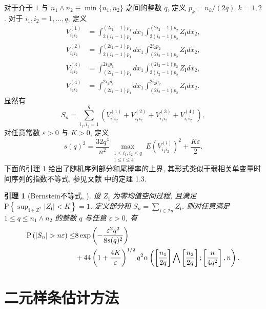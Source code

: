 \documentclass[a4paper,openay,14pt]{ctexbook}
\numberwithin{equation}{section}
\numberwithin{lem}{section}
\newtheorem{lemma}[theorem]{引理}%
\begin{document}
对于介于 $1$ 与 $n_1\wedge n_2\equiv \min\{n_1,n_2\}$ 之间的整数 $q$, 定义 $p_k=n_k/(2q), k=1,2$. 对于 $i_1,i_2=1,\ldots,q$, 定义
$$
\begin{aligned}
V_{i_1 i_2}^{(1)} & =\int_{2(i_1-1) p_1}^{(2 i_1-1) p_1} d x_1 \int_{2(i_2-1) p_2}^{(2 i_2-1) p_2} Z_\mathbf{i} d x_2, \\
V_{i_1 i_2}^{(2)} & =\int_{2(i_1-1) p_1}^{(2 i_1-1) p_1} d x_1 \int_{(2 i_2-1) p_2}^{2 i_2 p_2} Z_\mathbf{i} d x_2, \\
V_{i_1 i_2}^{(3)} & =\int_{(2 i_1-1) p_1}^{2 i_1 p_1} d x_1 \int_{2(i_2-1) p_2}^{(2 i_2-1) p_2} Z_\mathbf{i} d x_2, \\
V_{i_1 i_2}^{(4)} & =\int_{(2 i_1-1) p_1}^{2 i_1 p_1} d x_1 \int_{(2 i_2-1) p_2}^{2 i_2 p_2} Z_\mathbf{i} d x_2 .
\end{aligned}
$$
显然有
$$
S_n=\sum_{i_1, i_2=1}^q\left(V_{i_1 i_2}^{(1)}+V_{i_1 i_2}^{(2)}+V_{i_1 i_2}^{(3)}+V_{i_1 i_2}^{(4)}\right),
$$
对任意常数 $\varepsilon>0$ 与 $K>0$, 定义
$$
s(q)^2=\frac{32 q^4}{n^2} \max _{\substack{1 \leq i_1, i_2 \leq q \\ 1 \leq l \leq 4}} E\left(V_{i_1 i_2}^{(l)}\right)^2+\frac{K \varepsilon}{2}.
$$
下面的引理 \ref{Lemma:Bernstein} 给出了随机序列部分和尾概率的上界, 其形式类似于弱相关单变量时间序列的指数不等式, 参见文献\cite{bosq2012nonparametric} 中的定理 1.3.

\begin{lemma}[Bernstein不等式, \cite{yao2003exponential}]\label{Lemma:Bernstein}
设 ${Z_{\mathbf{i}}}$ 为零均值空间过程, 且满足$\mathrm{P}\left\{\sup_{\mathbf{i}\in\mathbb{Z}^2}\left\vert Z_{\mathbf{i}}\right\vert<K\right\} = 1$. 定义部分和 $S_n=\sum_{\mathbf{i}\in\mathcal{I}n} Z_{\mathbf{i}}$. 则对任意满足 $1\le q\le n_1\wedge n_2$ 的整数 $q$ 与任意 $\varepsilon>0$, 有
\begin{align*}
    \mathrm{P}\left(\left|S_n\right|>n \varepsilon\right) \leq
    &8\exp \left(-\frac{\varepsilon^2 q^2}{8 s(q)^2}\right)\notag\\
    &+ 44\left(1+\frac{4 K}{\varepsilon}\right)^{1 / 2} q^2 \alpha\left(\left[\frac{n_1}{2 q}\right] \bigwedge\left[\frac{n_2}{2 q}\right] ;\left[\frac{n}{4 q^2}\right], n\right).
    \end{align*}
\end{lemma}

\section{二元样条估计方法}\label{BST}
\end{document}
